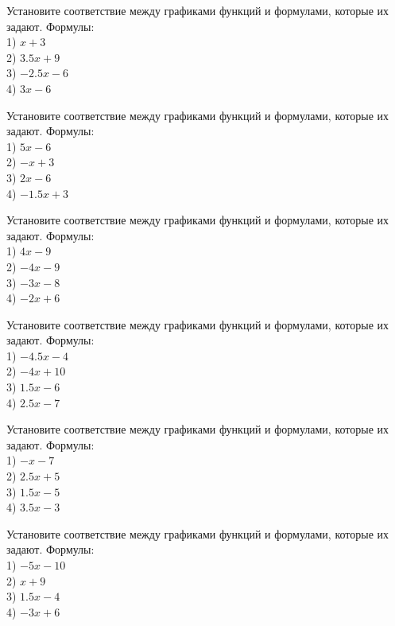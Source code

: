 \documentclass[4apaper]{article}
\begin{document}
\begin{taskBN}{85}
Установите соответствие между графиками функций и формулами, которые их задают. Формулы: \\1) $x+3$\\2) $3.5x+9$\\3) $-2.5x-6$\\4) $3x-6$
\end{taskBN}

\begin{taskBN}{86}
Установите соответствие между графиками функций и формулами, которые их задают. Формулы: \\1) $5x-6$\\2) $-x+3$\\3) $2x-6$\\4) $-1.5x+3$
\end{taskBN}

\begin{taskBN}{87}
Установите соответствие между графиками функций и формулами, которые их задают. Формулы: \\1) $4x-9$\\2) $-4x-9$\\3) $-3x-8$\\4) $-2x+6$
\end{taskBN}

\begin{taskBN}{88}
Установите соответствие между графиками функций и формулами, которые их задают. Формулы: \\1) $-4.5x-4$\\2) $-4x+10$\\3) $1.5x-6$\\4) $2.5x-7$
\end{taskBN}

\begin{taskBN}{89}
Установите соответствие между графиками функций и формулами, которые их задают. Формулы: \\1) $-x-7$\\2) $2.5x+5$\\3) $1.5x-5$\\4) $3.5x-3$
\end{taskBN}

\begin{taskBN}{90}
Установите соответствие между графиками функций и формулами, которые их задают. Формулы: \\1) $-5x-10$\\2) $x+9$\\3) $1.5x-4$\\4) $-3x+6$
\end{taskBN}
\end{document}
